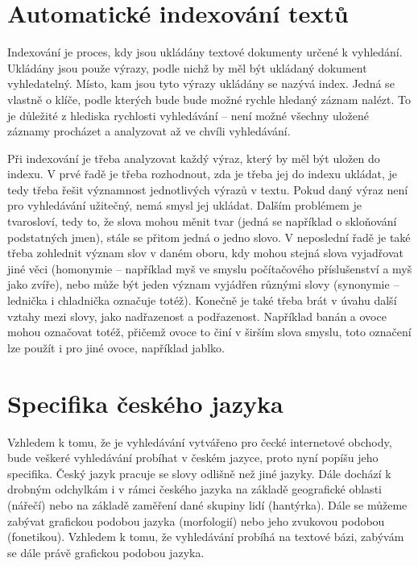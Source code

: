 \documentclass[FM,DP]{tulthesis}
\begin{document}
\section{Automatické indexování textů}

Indexování je proces, kdy jsou ukládány textové dokumenty určené k vyhledání.
Ukládány jsou použe výrazy, podle nichž by měl být ukládaný dokument vyhledatelný. 
Místo, kam jsou tyto výrazy ukládány se nazývá index. Jedná se vlastně o klíče, 
podle kterých bude bude možné rychle hledaný záznam nalézt. To je důležité z hlediska
rychlosti vyhledávání -- není možné všechny uložené záznamy procházet a analyzovat
až ve chvíli vyhledávání. 

Při indexování je třeba analyzovat každý výraz, který by měl být uložen do indexu.
V prvé řadě je třeba rozhodnout, zda je třeba jej do indexu ukládat, je tedy 
třeba řešit významnost jednotlivých výrazů v textu. Pokud daný
výraz není pro vyhledávání užitečný, nemá smysl jej ukládat. Dalším problémem je 
tvarosloví, tedy to, že slova mohou měnit tvar (jedná se například o skloňování 
podstatných jmen), stále se přitom jedná o jedno slovo. V neposlední řadě je také 
třeba zohlednit význam slov v daném oboru, kdy mohou stejná slova vyjadřovat jiné věci 
(homonymie -- například myš ve smyslu počítačového příslušenství a myš jako zvíře), 
nebo může být jeden význam vyjádřen různými slovy (synonymie -- lednička i chladnička 
označuje totéž). Konečně je také třeba brát v úvahu další vztahy mezi slovy, 
jako nadřazenost a podřazenost. Například banán a ovoce mohou označovat totéž, 
přičemž ovoce to činí v širším slova smyslu, toto označení lze použít i pro jiné 
ovoce, například jablko.

\section{Specifika českého jazyka}

Vzhledem k tomu, že je vyhledávání vytvářeno pro čecké internetové obchody, 
bude veškeré vyhledávání probíhat v českém jazyce, proto nyní popíšu jeho specifika.
Český jazyk pracuje se slovy odlišně než jiné jazyky. Dále dochází k drobným
odchylkám i v rámci českého jazyka na základě geografické oblasti (nářečí)
nebo na základě zaměření dané skupiny lidí (hantýrka). Dále se můžeme zabývat
grafickou podobou jazyka (morfologií) nebo jeho zvukovou podobou (fonetikou).
Vzhledem k tomu, že vyhledávání probíhá na textové bázi, zabývám se dále právě 
grafickou podobou jazyka.
\end{document}
